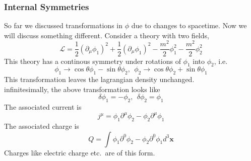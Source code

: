 \documentclass[11pt]{article}
\newcommand{\del}{\partial}
\newcommand{\ld}{\mathcal{L}}
\numberwithin{equation}{section}
\begin{document}
    \subsubsection{Internal Symmetries}
    So far we discussed transformations in \(\phi\) due to changes to spacetime. Now we will discuss something different. Consider a theory with two fields, 
    \begin{equation*}
        \ld = \frac{1}{2} (\del_\mu \phi_1)^2 + \frac{1}{2} (\del_\mu \phi_1)^2 - \frac{m^2}{2} \phi_1^2-\frac{m^2}{2} \phi_2^2
    \end{equation*} 
    This theory has a continous symmetry under rotations of \(\phi_1\) into \(\phi_2\), i.e. 
    \begin{equation*}
        \phi_1 \to \cos\theta \phi_1 - \sin\theta \phi_2,~~ \phi_2\to \cos\theta \phi_2 + \sin\theta \phi_1
    \end{equation*}
    This transformation leaves the lagrangian density unchanged. \\
    infinitesimally, the above transformation looks like 
    \begin{equation*}
        \delta \phi_1 = - \phi_2,~~\delta \phi_2 = \phi_1
    \end{equation*}
    The associated current is 
    \begin{equation*}
        j^\mu =  \phi_1 \del^\mu \phi_2 - \phi_2 \del^\mu \phi_1
    \end{equation*}
    The associated charge is 
    \begin{equation*}
        Q = \int \phi_1 \del^0 \phi_2 - \phi_2 \del^0 \phi_1 d^3\textbf{x}
    \end{equation*}
    Charges like electric charge etc.\ are of this form. \\
\end{document}
